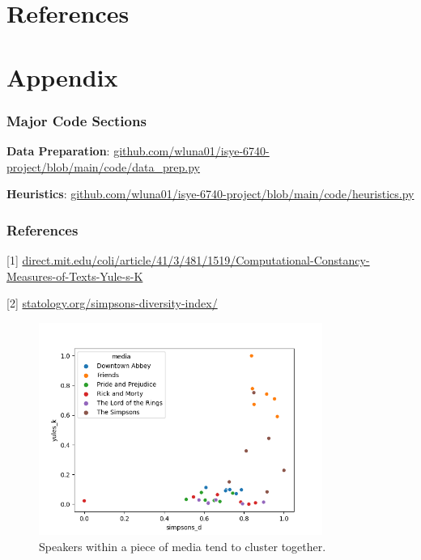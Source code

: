 \documentclass{article}
\newcommand{\largeimagewidth}{350}
\begin{document}
\begin{titlepage}
\section{References}

\section{Appendix}
\subsubsection{Major Code Sections}
\textbf{Data Preparation}: \url{github.com/wluna01/isye-6740-project/blob/main/code/data_prep.py}

\textbf{Heuristics}: \url{github.com/wluna01/isye-6740-project/blob/main/code/heuristics.py}

\subsubsection{References}
[1] \url{direct.mit.edu/coli/article/41/3/481/1519/Computational-Constancy-Measures-of-Texts-Yule-s-K}

[2] \url{statology.org/simpsons-diversity-index/}

\begin{figure}[H]
\centering
\includegraphics[width=\largeimagewidth]{images/heuristics.png}
\caption{Speakers within a piece of media tend to cluster together.}
\end{figure}


\end{titlepage}
\end{document}
